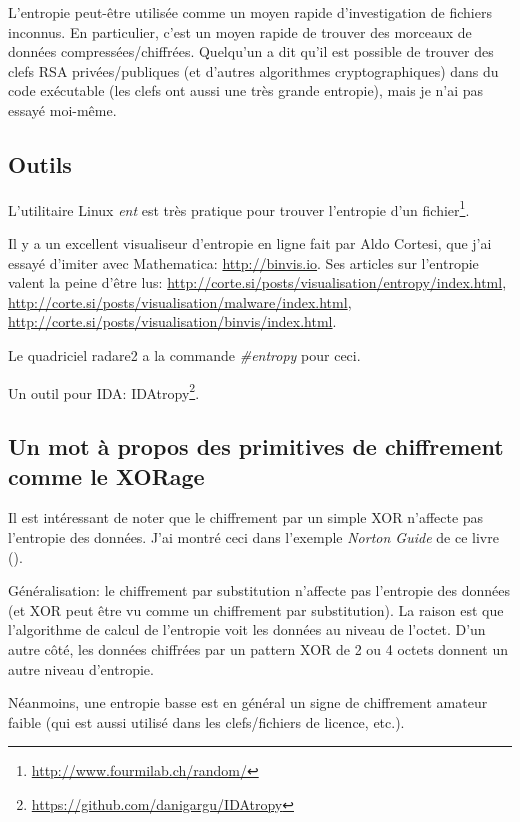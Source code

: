 L'entropie peut-être utilisée comme un moyen rapide d'investigation de fichiers inconnus.
En particulier, c'est un moyen rapide de trouver des morceaux de données compressées/chiffrées.
Quelqu'un a dit qu'il est possible de trouver des clefs \ac{RSA} privées/publiques
(et d'autres algorithmes cryptographiques) dans du code exécutable (les clefs ont
aussi une très grande entropie), mais je n'ai pas essayé moi-même.

\subsection{Outils}

L'utilitaire Linux \emph{ent} est très pratique pour trouver l'entropie d'un
fichier\footnote{\url{http://www.fourmilab.ch/random/}}.

Il y a un excellent visualiseur d'entropie en ligne fait par Aldo Cortesi,
que j'ai essayé d'imiter avec Mathematica: \url{http://binvis.io}.
Ses articles sur l'entropie valent la peine d'être lus:
\url{http://corte.si/posts/visualisation/entropy/index.html},
\url{http://corte.si/posts/visualisation/malware/index.html},
\url{http://corte.si/posts/visualisation/binvis/index.html}.

Le quadriciel radare2 a la commande \emph{\#entropy} pour ceci.

Un outil pour IDA: IDAtropy\footnote{\url{https://github.com/danigargu/IDAtropy}}.

\subsection{Un mot à propos des primitives de chiffrement comme le XORage}

Il est intéressant de noter que le chiffrement par un simple XOR n'affecte pas
l'entropie des données.
J'ai montré ceci dans l'exemple \emph{Norton Guide} de ce livre ().

Généralisation: le chiffrement par substitution n'affecte pas l'entropie des données
(et XOR peut être vu comme un chiffrement par substitution).
La raison est que l'algorithme de calcul de l'entropie voit les données au niveau
de l'octet.
D'un autre côté, les données chiffrées par un pattern XOR de 2 ou 4 octets donnent
un autre niveau d'entropie.

Néanmoins, une entropie basse est en général un signe de chiffrement amateur faible
(qui est aussi utilisé dans les clefs/fichiers de licence, etc.).


